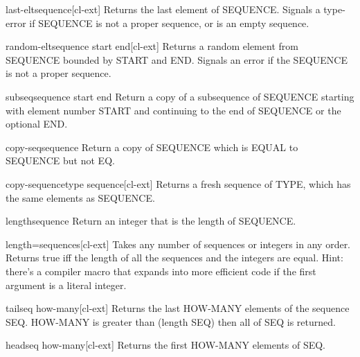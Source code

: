\documentclass[10pt,english]{book}
\begin{document}
\begin{function}{last-elt}{sequence}[cl-ext]
  Returns the last element of SEQUENCE. Signals a type-error if SEQUENCE is
  not a proper sequence, or is an empty sequence.
\end{function}

\begin{function}{random-elt}{sequence \key start end}[cl-ext]
  Returns a random element from SEQUENCE bounded by START and END.
  Signals an error if the SEQUENCE is not a proper sequence.
\end{function}

\begin{accessor}{subseq}{sequence start \op end}
  Return a copy of a subsequence of SEQUENCE starting with element number
  START and continuing to the end of SEQUENCE or the optional END.
\end{accessor}

\begin{function}{copy-seq}{sequence}
  Return a copy of SEQUENCE which is EQUAL to SEQUENCE but not EQ.
\end{function}

\begin{function}{copy-sequence}{type sequence}[cl-ext]
  Returns a fresh sequence of TYPE, which has the same elements as
  SEQUENCE.
\end{function}

\begin{function}{length}{sequence}
  Return an integer that is the length of SEQUENCE.
\end{function}

\begin{function}{length=}{\rest sequences}[cl-ext]
  Takes any number of sequences or integers in any order. Returns true
  iff the length of all the sequences and the integers are equal.
  Hint: there's a compiler macro that expands into more efficient code
  if the first argument is a literal integer.
\end{function}

\begin{function}{tail}{seq \op how-many}[cl-ext]
  Returns the last HOW-MANY elements of the sequence SEQ. HOW-MANY is
  greater than (length SEQ) then all of SEQ is returned.
\end{function}

\begin{function}{head}{seq \op how-many}[cl-ext]
  Returns the first HOW-MANY elements of SEQ.
\end{function}
\end{document}
